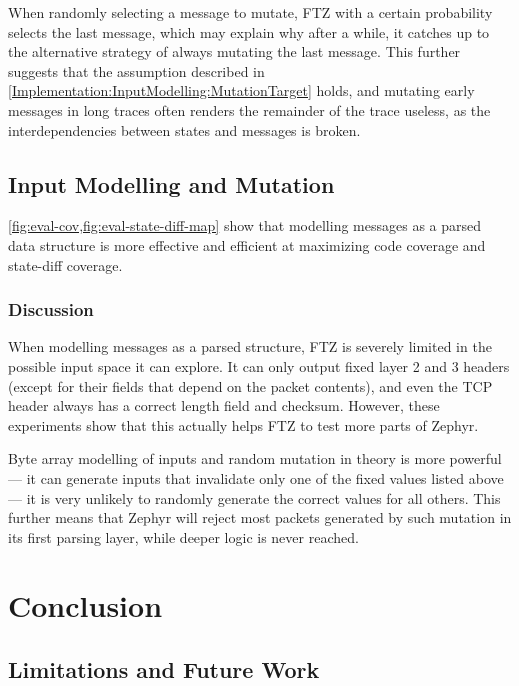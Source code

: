 \documentclass[twocolumn]{article}
\newcommand{\proj}{FTZ\xspace}
\begin{document}
When randomly selecting a message to mutate, \proj with a certain probability selects the last message, which may explain why after a while, it catches up to the alternative strategy of always mutating the last message. This further suggests that the assumption described in \cref{Implementation:InputModelling:MutationTarget} holds, and mutating early messages in long traces often renders the remainder of the trace useless, as the interdependencies between states and messages is broken.

\subsection{Input Modelling and Mutation}

\cref{fig:eval-cov,fig:eval-state-diff-map} show that modelling messages as a parsed data structure is more effective and efficient at maximizing code coverage and state-diff coverage.

\subsubsection*{Discussion}

When modelling messages as a parsed structure, \proj is severely limited in the possible input space it can explore. It can only output fixed layer 2 and 3 headers (except for their fields that depend on the packet contents), and even the TCP header always has a correct length field and checksum. However, these experiments show that this actually helps \proj to test more parts of Zephyr.

Byte array modelling of inputs and random mutation in theory is more powerful — it can generate inputs that invalidate only one of the fixed values listed above — it is very unlikely to randomly generate the correct values for all others. This further means that Zephyr will reject most packets generated by such mutation in its first parsing layer, while deeper logic is never reached.


\section{Conclusion}
\label{Conclusion}
\subsection{Limitations and Future Work}
\end{document}
